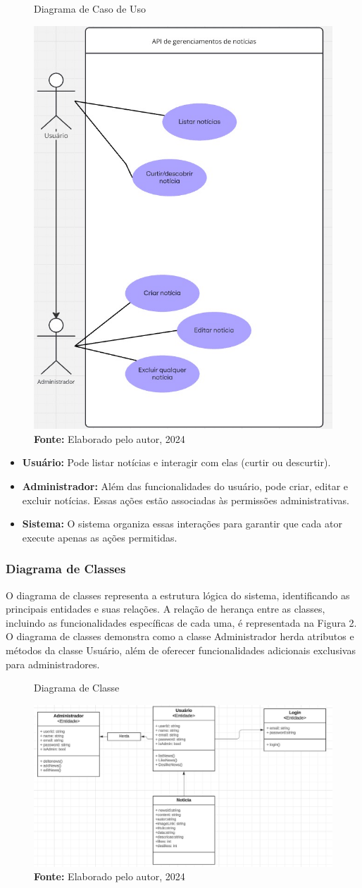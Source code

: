 \begin{figure} [H]
    \centering
    \caption{Diagrama de Caso de Uso}
    \includegraphics[width=0.5\linewidth]{imagens/diagram de caso de uso.jpeg}
    \caption*{\textbf{Fonte:} Elaborado pelo autor, 2024}
    \label{fig:enter-label}
\end{figure}

\begin{itemize}
    \item \textbf{Usuário:} Pode listar notícias e interagir com elas (curtir ou descurtir).
    \item \textbf{Administrador:} Além das funcionalidades do usuário, pode criar, editar e excluir notícias. Essas ações estão associadas às permissões administrativas.
    \item \textbf{Sistema:} O sistema organiza essas interações para garantir que cada ator execute apenas as ações permitidas.
\end{itemize}

\subsubsection{Diagrama de Classes}

O diagrama de classes representa a estrutura lógica do sistema, identificando as principais entidades e suas relações. A relação de herança entre as classes, incluindo as funcionalidades específicas de cada uma, é representada na Figura 2. O diagrama de classes demonstra como a classe Administrador herda atributos e métodos da classe Usuário, além de oferecer funcionalidades adicionais exclusivas para administradores.

\begin{figure} [H]
    \centering
    \caption{Diagrama de Classe}
    \includegraphics[width=0.5\linewidth]{imagens/diagram de objeto.jpeg}
    \caption*{\textbf{Fonte:} Elaborado pelo autor, 2024}
    \label{fig:enter-label}
\end{figure}

